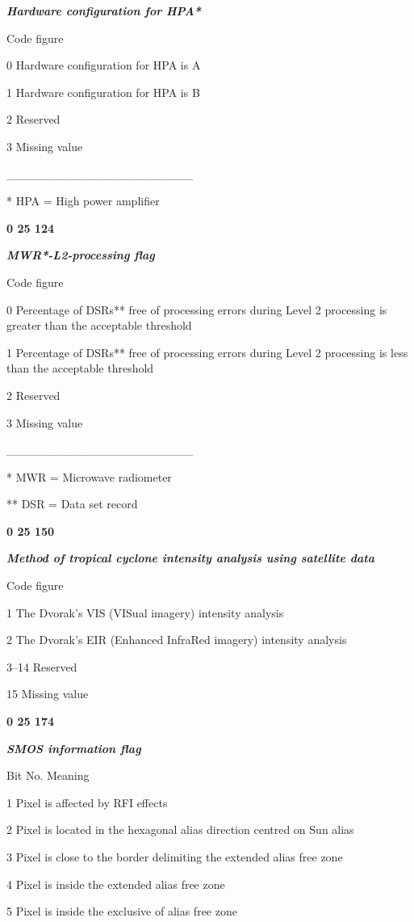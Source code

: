 \emph{\textbf{Hardware configuration for HPA*}}

Code figure

0 Hardware configuration for HPA is A

1 Hardware configuration for HPA is B

2 Reserved

3 Missing value

\_\_\_\_\_\_\_\_\_\_\_\_\_\_\_\_\_\_\_\_\_\_

* HPA = High power amplifier

\textbf{0 25 124}

\emph{\textbf{MWR*-L2-processing flag}}

Code figure

0 Percentage of DSRs** free of processing errors during Level 2 processing is greater than the acceptable threshold

1 Percentage of DSRs** free of processing errors during Level 2 processing is less than the acceptable threshold

2 Reserved

3 Missing value

\_\_\_\_\_\_\_\_\_\_\_\_\_\_\_\_\_\_\_\_\_\_

* MWR = Microwave radiometer

** DSR = Data set record

\textbf{0 25 150}

\emph{\textbf{Method of tropical cyclone intensity analysis using satellite data}}

Code figure

1 The Dvorak's VIS (VISual imagery) intensity analysis

2 The Dvorak's EIR (Enhanced InfraRed imagery) intensity analysis

3--14 Reserved

15 Missing value

\textbf{0 25 174}

\emph{\textbf{SMOS information flag}}

Bit No. Meaning

1 Pixel is affected by RFI effects

2 Pixel is located in the hexagonal alias direction centred on Sun alias

3 Pixel is close to the border delimiting the extended alias free zone

4 Pixel is inside the extended alias free zone

5 Pixel is inside the exclusive of alias free zone

